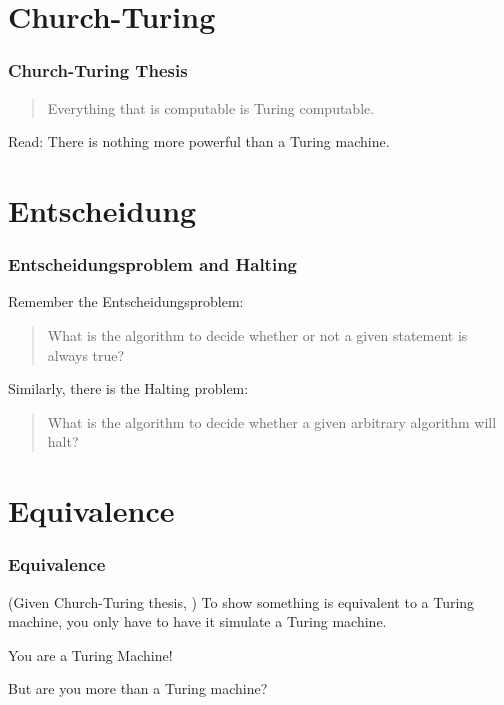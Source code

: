 \documentclass[mathserif]{beamer}
\begin{document}
\section{Church-Turing}
\begin{frame}
  \frametitle{Church-Turing Thesis}

  \begin{quote}
    Everything that is computable is Turing computable.
  \end{quote}

  Read: There is nothing more powerful than a Turing machine.
\end{frame}

\section{Entscheidung}
\begin{frame}
  \frametitle{Entscheidungsproblem and Halting}

  Remember the Entscheidungsproblem:
    \begin{quote}
      What is the algorithm to decide whether or not a given statement is always
      true?
    \end{quote}

  Similarly, there is the Halting problem:
  \begin{quote}
    What is the algorithm to decide whether a given arbitrary algorithm will
    halt?
  \end{quote}

\end{frame}

\section{Equivalence}
\begin{frame}
  \frametitle{Equivalence}

  \begin{center}
    (Given Church-Turing thesis, ) To show something is equivalent to a Turing
    machine, you only have to have it simulate a Turing machine.

    \vspace{10mm}

    \Large You are a Turing Machine!

    But are you more than a Turing machine?
  \end{center}
\end{frame}
\end{document}
